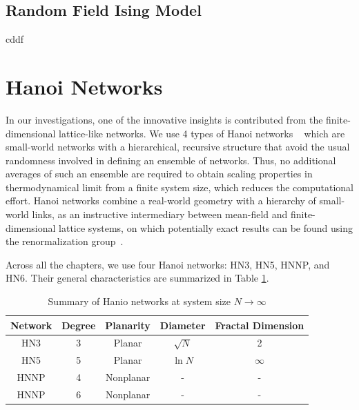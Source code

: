 \subsection{Random Field Ising Model}
\label{sec:intro-rfim}
cddf

\section{Hanoi Networks}
\label{sec:HN} 
In our investigations, one of the innovative insights is contributed from the finite-dimensional lattice-like networks. We use 4 types of Hanoi networks ~\cite{Boettcher2008HN} which are small-world networks with a hierarchical, recursive structure that avoid the usual randomness involved in defining
an ensemble of networks. Thus, no additional averages of such an ensemble
are required to obtain scaling properties in thermodynamical limit
from a finite system size, which reduces the computational effort.
Hanoi networks combine a real-world geometry with a hierarchy of small-world
links, as an instructive intermediary between mean-field and finite-dimensional
lattice systems, on which potentially exact results can be found using
the renormalization group~\cite{BoHa11}. 

Across all the chapters, we use four Hanoi networks: HN3, HN5, HNNP, and HN6. Their general characteristics are summarized in Table \ref{tab:hns}.

\begin{table}
\begin{centering}
\protect\caption{\label{tab:hns} 
Summary of Hanio networks at system size $N\rightarrow\infty$ }
\par\end{centering}
\begin{centering}
\par\end{centering}
\centering{}%
\begin{tabular}{|c|c|c|c|c|}
\hline 
Network & Degree  & Planarity & Diameter & Fractal Dimension  \tabularnewline
\hline 
\hline 
HN3  & 3 & Planar & $\sqrt{N}$ & 2 \tabularnewline
\hline 
HN5  & 5 & Planar &  $\ln N$ & $\infty$  \tabularnewline
\hline 
HNNP  & 4  & Nonplanar &  - & -  \tabularnewline
\hline 
HNNP  & 6  & Nonplanar &  - & - \tabularnewline
\hline 
\end{tabular}
\end{table}

